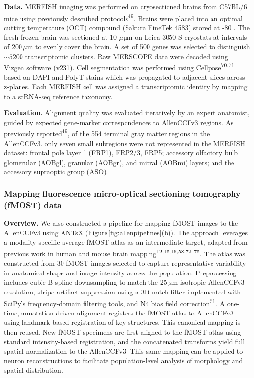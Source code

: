 \documentclass[
  12pt,
]{article}
\begin{document}
\textbf{Data.} MERFISH imaging was performed on cryosectioned brains
from C57BL/6 mice using previously described
protocols\textsuperscript{49}. Brains were placed into an optimal
cutting temperature (OCT) compound (Sakura FineTek 4583) stored at
-80\(^\circ\). The fresh frozen brain was sectioned at 10 \(\mu\)µm on
Leica 3050 S cryostats at intervals of 200\,\(\mu\)m to evenly cover the
brain. A set of 500 genes was selected to distinguish \(\sim 5200\)
transcriptomic clusters. Raw MERSCOPE data were decoded using Vizgen
software (v231). Cell segmentation was performed using
Cellpose\textsuperscript{70,71} based on DAPI and PolyT stains which was
propagated to adjacent slices across z-planes. Each MERFISH cell was
assigned a transcriptomic identity by mapping to a scRNA-seq reference
taxonomy.

\textbf{Evaluation.} Alignment quality was evaluated iteratively by an
expert anatomist, guided by expected gene-marker correspondences to
AllenCCFv3 regions. As previously reported\textsuperscript{49}, of the
554 terminal gray matter regions in the AllenCCFv3, only seven small
subregions were not represented in the MERFISH dataset: frontal pole
layer 1 (FRP1), FRP2/3, FRP5; accessory olfactory bulb glomerular
(AOBgl), granular (AOBgr), and mitral (AOBmi) layers; and the accessory
supraoptic group (ASO).

\subsubsection{Mapping fluorescence micro-optical sectioning tomography
(fMOST)
data}\label{mapping-fluorescence-micro-optical-sectioning-tomography-fmost-data}

\textbf{Overview.} We also constructed a pipeline for mapping fMOST
images to the AllenCCFv3 using ANTsX
(Figure\,\ref{fig:allenpipelines}(b)). The approach leverages a
modality-specific average fMOST atlas as an intermediate target, adapted
from previous work in human and mouse brain
mapping\textsuperscript{12,15,16,58,72--75}. The atlas was constructed
from 30 fMOST images selected to capture representative variability in
anatomical shape and image intensity across the population.
Preprocessing includes cubic B-spline downsampling to match the
25\,\(\mu\)m isotropic AllenCCFv3 resolution, stripe artifact
suppression using a 3D notch filter implemented with SciPy's
frequency-domain filtering tools, and N4 bias field
correction\textsuperscript{51}. A one-time, annotation-driven alignment
registers the fMOST atlas to AllenCCFv3 using landmark-based
registration of key structures. This canonical mapping is then reused.
New fMOST specimens are first aligned to the fMOST atlas using standard
intensity-based registration, and the concatenated transforms yield full
spatial normalization to the AllenCCFv3. This same mapping can be
applied to neuron reconstructions to facilitate population-level
analysis of morphology and spatial distribution.
\end{document}
